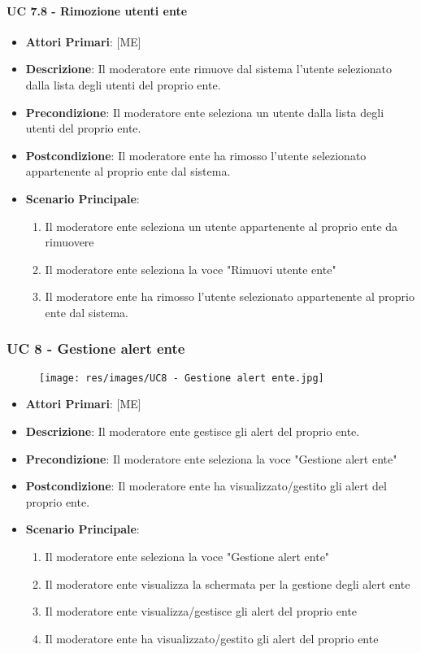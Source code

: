 			\paragraph{UC 7.8 - Rimozione utenti ente}
			\begin{itemize}
				\item \textbf{Attori Primari}: [ME]
				\item \textbf{Descrizione}: Il moderatore ente rimuove dal sistema l'utente selezionato dalla lista degli utenti del proprio ente.
				\item \textbf{Precondizione}: Il moderatore ente seleziona un utente dalla lista degli utenti del proprio ente.
				\item \textbf{Postcondizione}: Il moderatore ente ha rimosso l'utente selezionato appartenente al proprio ente dal sistema.
				\item \textbf{Scenario Principale}:
				\begin{enumerate}
					\item{Il moderatore ente seleziona un utente appartenente al proprio ente da rimuovere}
					\item{Il moderatore ente seleziona la voce "Rimuovi utente ente"}
					\item{Il moderatore ente ha rimosso l'utente selezionato appartenente al proprio ente dal sistema.}
				\end{enumerate}		
			\end{itemize}

		\subsubsection{UC 8 - Gestione alert ente}
		
		\begin{figure}[t!]
			\centering
			\texttt{[image: res/images/UC8 - Gestione alert ente.jpg]}
		\end{figure}
		
		\begin{itemize}
			\item \textbf{Attori Primari}: [ME]
			\item \textbf{Descrizione}: Il moderatore ente gestisce gli alert del proprio ente.
			\item \textbf{Precondizione}: Il moderatore ente seleziona la voce "Gestione alert ente"
			\item \textbf{Postcondizione}: Il moderatore ente ha visualizzato/gestito gli alert del proprio ente.
			\item \textbf{Scenario Principale}:
			\begin{enumerate}
				\item{Il moderatore ente seleziona la voce "Gestione alert ente"}
				\item{Il moderatore ente visualizza la schermata per la gestione degli alert ente}
				\item{Il moderatore ente visualizza/gestisce gli alert del proprio ente}
				\item{Il moderatore ente ha visualizzato/gestito gli alert del proprio ente}
			\end{enumerate}	
		\end{itemize}
			

